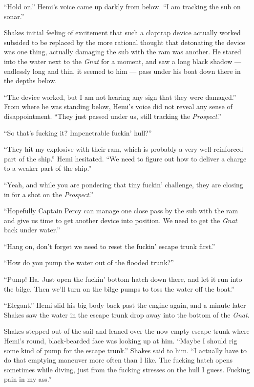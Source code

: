 \documentclass[]{scrbook}
\begin{document}
``Hold on.'' Hemi's voice came up darkly from below. ``I am tracking the
sub on sonar.''

Shakes initial feeling of excitement that such a claptrap device
actually worked subsided to be replaced by the more rational thought
that detonating the device was one thing, actually damaging the sub with
the ram was another. He stared into the water next to the \emph{Gnat}
for a moment, and saw a long black shadow --- endlessly long and thin,
it seemed to him --- pass under his boat down there in the depths below.

``The device worked, but I am not hearing any sign that they were
damaged.'' From where he was standing below, Hemi's voice did not reveal
any sense of disappointment. ``They just passed under us, still tracking
the \emph{Prospect}.''

``So that's fucking it? Impenetrable fuckin' hull?''

``They hit my explosive with their ram, which is probably a very
well-reinforced part of the ship.'' Hemi hesitated. ``We need to figure
out how to deliver a charge to a weaker part of the ship.''

``Yeah, and while you are pondering that tiny fuckin' challenge, they
are closing in for a shot on the \emph{Prospect}.''

``Hopefully Captain Percy can manage one close pass by the sub with the
ram and give us time to get another device into position. We need to get
the \emph{Gnat} back under water.''

``Hang on, don't forget we need to reset the fuckin' escape trunk
first.''

``How do you pump the water out of the flooded trunk?''

``Pump! Ha. Just open the fuckin' bottom hatch down there, and let it
run into the bilge. Then we'll turn on the bilge pumps to toss the water
off the boat.''

``Elegant.'' Hemi slid his big body back past the engine again, and a
minute later Shakes saw the water in the escape trunk drop away into the
bottom of the \emph{Gnat}.

Shakes stepped out of the sail and leaned over the now empty escape
trunk where Hemi's round, black-bearded face was looking up at him.
``Maybe I should rig some kind of pump for the escape trunk.'' Shakes
said to him. ``I actually have to do that emptying maneuver more often
than I like. The fucking hatch opens sometimes while diving, just from
the fucking stresses on the hull I guess. Fucking pain in my ass.''
\end{document}
